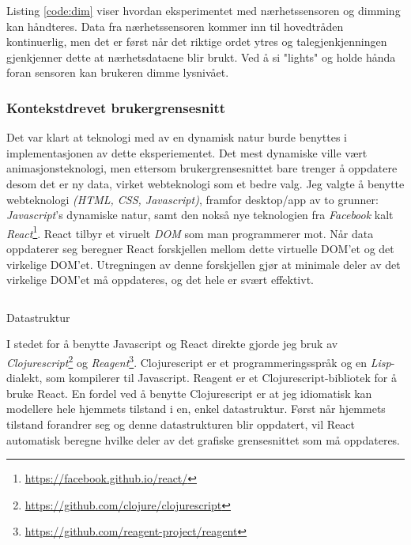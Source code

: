 Listing \ref{code:dim} viser hvordan eksperimentet med nærhetssensoren og dimming kan håndteres. Data fra nærhetssensoren kommer inn til hovedtråden kontinuerlig, men det er først når det riktige ordet ytres og talegjenkjenningen gjenkjenner dette at nærhetsdataene blir brukt. Ved å si "lights" og holde hånda foran sensoren kan brukeren dimme lysnivået.

\subsubsection{Kontekstdrevet brukergrensesnitt}
Det var klart at teknologi med av en dynamisk natur burde benyttes i implementasjonen av dette eksperiementet. Det mest dynamiske ville vært animasjonsteknologi, men ettersom brukergrensesnittet bare trenger å oppdatere desom det er ny data, virket webteknologi som et bedre valg. Jeg valgte å benytte webteknologi \emph{(HTML, CSS, Javascript)}, framfor desktop/app av to grunner: \emph{Javascript}'s dynamiske natur, samt den nokså nye teknologien fra \emph{Facebook} kalt \emph{React}\footnote{\url{https://facebook.github.io/react/}}. React tilbyr et viruelt \emph{DOM} som man programmerer mot. Når data oppdaterer seg beregner React forskjellen mellom dette virtuelle DOM'et og det virkelige DOM'et. Utregningen av denne forskjellen gjør at minimale deler av det virkelige DOM'et må oppdateres, og det hele er svært effektivt.
\begin{listing}[ht]
\label{code:datastructure}
\inputminted[fontsize=\footnotesize, linenos]{clj}{kodesnutter/data.clj}
\caption{Datastruktur}
\end{listing}
I stedet for å benytte Javascript og React direkte gjorde jeg bruk av \emph{Clojurescript}\footnote{\url{https://github.com/clojure/clojurescript}} og \emph{Reagent}\footnote{\url{https://github.com/reagent-project/reagent}}. Clojurescript er et programmeringsspråk og en \emph{Lisp}-dialekt, som kompilerer til Javascript. Reagent er et Clojurescript-bibliotek for å bruke React. En fordel ved å benytte Clojurescript er at jeg idiomatisk kan modellere hele hjemmets tilstand i en, enkel datastruktur. Først når hjemmets tilstand forandrer seg og denne datastrukturen blir oppdatert, vil React automatisk beregne hvilke deler av det grafiske grensesnittet som må oppdateres.

